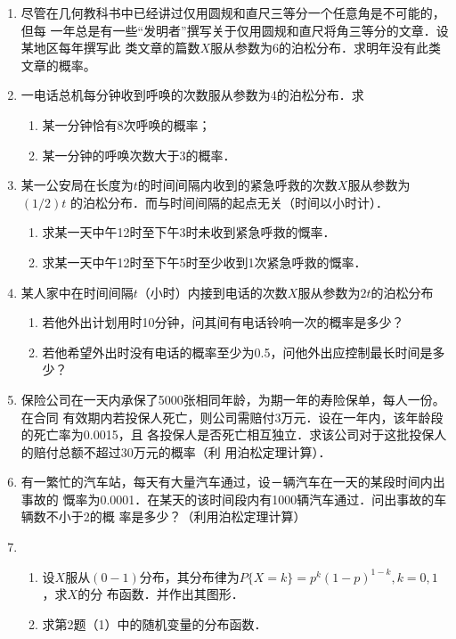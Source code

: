 \documentclass[10pt,a4paper]{article}
\begin{document}
\begin{enumerate}
    \item 尽管在几何教科书中已经讲过仅用圆规和直尺三等分一个任意角是不可能的，但每
    一年总是有一些“发明者”撰写关于仅用圆规和直尺将角三等分的文章．设某地区每年撰写此
    类文章的篇数$X$服从参数为6的泊松分布．求明年没有此类文章的概率。


    \item 一电话总机每分钟收到呼唤的次数服从参数为4的泊松分布．求
    \begin{enumerate}
        \item 某一分钟恰有8次呼唤的概率；
        \item 某一分钟的呼唤次数大于3的概率．
    \end{enumerate}


    \item 某一公安局在长度为$t$的时间间隔内收到的紧急呼救的次数$X$服从参数为$(1/2)t$
    的泊松分布．而与时间间隔的起点无关（时间以小时计）．
    \begin{enumerate}
        \item 求某一天中午12时至下午3时未收到紧急呼救的慨率．
        \item 求某一天中午12时至下午5时至少收到1次紧急呼救的慨率．
    \end{enumerate}



    \item 某人家中在时间间隔$t$（小时）内接到电话的次数$X$服从参数为$2t$的泊松分布
    \begin{enumerate}
        \item 若他外出计划用时10分钟，问其间有电话铃响一次的概率是多少？
        \item 若他希望外出时没有电话的概率至少为0.5，问他外出应控制最长时间是多少？
    \end{enumerate}



    \item 保险公司在一天内承保了5000张相同年龄，为期一年的寿险保单，每人一份。在合同
    有效期内若投保人死亡，则公司需赔付3万元．设在一年内，该年龄段的死亡率为0.0015，且
    各投保人是否死亡相互独立．求该公司对于这批投保人的赔付总额不超过30万元的概率（利
    用泊松定理计算）．

    \item 有一繁忙的汽车站，每天有大量汽车通过，设－辆汽车在一天的某段时间内出事故的
    慨率为0.0001．在某天的该时间段内有1000辆汽车通过．问出事故的车辆数不小于2的概
    率是多少？（利用泊松定理计算）


    \item \begin{enumerate}
        \item 设$X$服从$(0-1)$分布，其分布律为$P\{X=k\}=p^k{(1-p)}^{1-k},k=0,1$，求$X$的分
        布函数．并作出其图形．
        \item 求第2题（1）中的随机变量的分布函数．
    \end{enumerate}



\end{enumerate}
\end{document}
